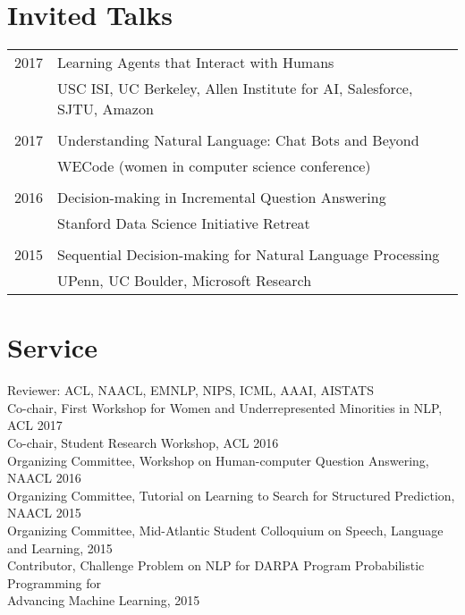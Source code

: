 \documentclass[a4paper,11pt]{article}
\begin{document}
\section{Invited Talks}
\begin{tabular}{rl}    
2017 & Learning Agents that Interact with Humans \\
& USC ISI, UC Berkeley, Allen Institute for AI, Salesforce, SJTU, Amazon\\
\\
2017 & Understanding Natural Language: Chat Bots and Beyond\\
& WECode (women in computer science conference)\\
\\
2016 & Decision-making in Incremental Question Answering \\
& Stanford Data Science Initiative Retreat\\
\\
2015 & Sequential Decision-making for Natural Language Processing\\
& UPenn, UC Boulder, Microsoft Research\\
\end{tabular}

\section{Service}
{Reviewer:} ACL, NAACL, EMNLP, NIPS, ICML, AAAI, AISTATS\\
{Co-chair,} First Workshop for Women and Underrepresented Minorities in NLP, ACL 2017\\
{Co-chair,} Student Research Workshop, ACL 2016\\
{Organizing Committee,} Workshop on Human-computer Question Answering, NAACL 2016\\
{Organizing Committee,} Tutorial on Learning to Search for Structured Prediction, NAACL 2015\\
{Organizing Committee,} Mid-Atlantic Student Colloquium on Speech, Language and Learning, 2015\\
{Contributor,} Challenge Problem on NLP for DARPA Program Probabilistic Programming for\\
Advancing Machine Learning, 2015\\
\end{document}
